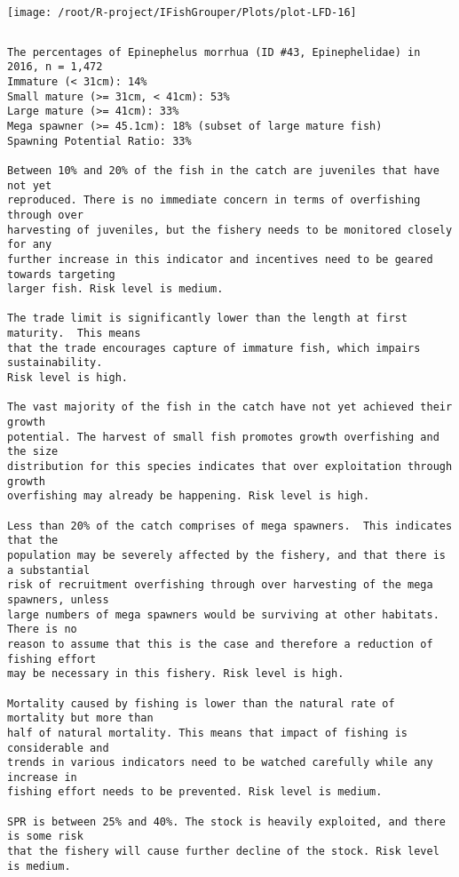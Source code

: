 \documentclass{report}\usepackage[]{graphicx}\usepackage[]{color}
\makeatletter
\def\maxwidth{ %
  \ifdim\Gin@nat@width>\linewidth
    \linewidth
  \else
    \Gin@nat@width
  \fi
}
\newenvironment{kframe}{%
 \def\at@end@of@kframe{}%
 \ifinner\ifhmode%
  \def\at@end@of@kframe{\end{minipage}}%
  \begin{minipage}{\columnwidth}%
 \fi\fi%
 \def\FrameCommand##1{\hskip\@totalleftmargin \hskip-\fboxsep
 \colorbox{shadecolor}{##1}\hskip-\fboxsep
     \hskip-\linewidth \hskip-\@totalleftmargin \hskip\columnwidth}%
 \MakeFramed {\advance\hsize-\width
   \@totalleftmargin\z@ \linewidth\hsize
   \@setminipage}}%
 {\par\unskip\endMakeFramed%
 \at@end@of@kframe}
\newenvironment{knitrout}{}{} %
\makeatother
\begin{document}
\begin{knitrout}
\texttt{[image: /root/R-project/IFishGrouper/Plots/plot-LFD-16]} 
\begin{kframe}\begin{verbatim}
\end{verbatim}
\end{kframe}
\clearpage
\newpage
\begin{kframe}\begin{verbatim}The percentages of Epinephelus morrhua (ID #43, Epinephelidae) in 2016, n = 1,472
Immature (< 31cm): 14%
Small mature (>= 31cm, < 41cm): 53%
Large mature (>= 41cm): 33%
Mega spawner (>= 45.1cm): 18% (subset of large mature fish)
Spawning Potential Ratio: 33%
 
Between 10% and 20% of the fish in the catch are juveniles that have not yet
reproduced. There is no immediate concern in terms of overfishing through over
harvesting of juveniles, but the fishery needs to be monitored closely for any
further increase in this indicator and incentives need to be geared towards targeting
larger fish. Risk level is medium.

The trade limit is significantly lower than the length at first maturity.  This means
that the trade encourages capture of immature fish, which impairs sustainability.
Risk level is high.

The vast majority of the fish in the catch have not yet achieved their growth
potential. The harvest of small fish promotes growth overfishing and the size
distribution for this species indicates that over exploitation through growth
overfishing may already be happening. Risk level is high.

Less than 20% of the catch comprises of mega spawners.  This indicates that the
population may be severely affected by the fishery, and that there is a substantial
risk of recruitment overfishing through over harvesting of the mega spawners, unless
large numbers of mega spawners would be surviving at other habitats. There is no
reason to assume that this is the case and therefore a reduction of fishing effort
may be necessary in this fishery. Risk level is high.
 
Mortality caused by fishing is lower than the natural rate of mortality but more than
half of natural mortality. This means that impact of fishing is considerable and
trends in various indicators need to be watched carefully while any increase in
fishing effort needs to be prevented. Risk level is medium.
 
SPR is between 25% and 40%. The stock is heavily exploited, and there is some risk
that the fishery will cause further decline of the stock. Risk level is medium.
 

\end{verbatim}
\end{kframe}
\end{knitrout}
\end{document}
